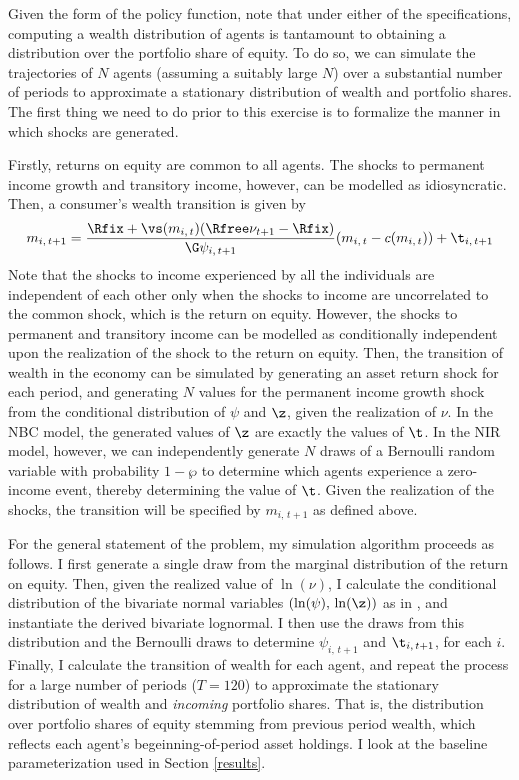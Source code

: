 Given the form of the policy function, note that under either of the specifications, computing a wealth distribution of agents is tantamount to obtaining a distribution over the portfolio share of equity. To do so, we can simulate the trajectories of $N$ agents (assuming a suitably large $N$) over a substantial number of periods to approximate a stationary distribution of wealth and portfolio shares. The first thing we need to do prior to this exercise is to formalize the manner in which shocks are generated.

Firstly, returns on equity are common to all agents. The shocks to permanent income growth and transitory income, however, can be modelled as idiosyncratic. Then, a consumer's wealth transition is given by
\[
m_{i,\,t+1} = \frac{\Rfix + \vs(m_{i,\,t})(\Rfree\nu_{t+1} - \Rfix)}{\G\psi_{i,\,t+1}}(m_{i,\,t} - c(m_{i,\,t})) + \t_{i,\,t+1}
\]
Note that the shocks to income experienced by all the individuals are independent of each other only when the shocks to income are uncorrelated to the common shock, which is the return on equity. However, the shocks to permanent and transitory income can be modelled as conditionally independent upon the realization of the shock to the return on equity. Then, the transition of wealth in the economy can be simulated by generating an asset return shock for each period, and generating $N$ values for the permanent income growth shock from the conditional distribution of $\psi$ and $\z$, given the realization of $\nu$. In the NBC model, the generated values of $\z$ are exactly the values of $\t$. In the NIR model, however, we can independently generate $N$ draws of a Bernoulli random variable with probability $1 - \wp$ to determine which agents experience a zero-income event, thereby determining the value of $\t$. Given the realization of the shocks, the transition will be specified by $m_{i,\,t+1}$ as defined above.

For the general statement of the problem, my simulation algorithm proceeds as follows. I first generate a single draw from the marginal distribution of the return on equity. Then, given the realized value of $\ln(\nu)$, I calculate the conditional distribution of the bivariate normal variables $(\ln(\psi),\,\ln(\z))$ as in \citet[p.34]{Anderson2003}, and instantiate the derived bivariate lognormal. I then use the draws from this distribution and the Bernoulli draws to determine $\psi_{i,\,t+1}$ and $\t_{i,\,t+1}$, for each $i$. Finally, I calculate the transition of wealth for each agent, and repeat the process for a large number of periods ($T = 120$) to approximate the stationary distribution of wealth and \textit{incoming} portfolio shares. That is, the distribution over portfolio shares of equity stemming from previous period wealth, which reflects each agent's begeinning-of-period asset holdings. I look at the baseline parameterization used in Section \ref{results}.

